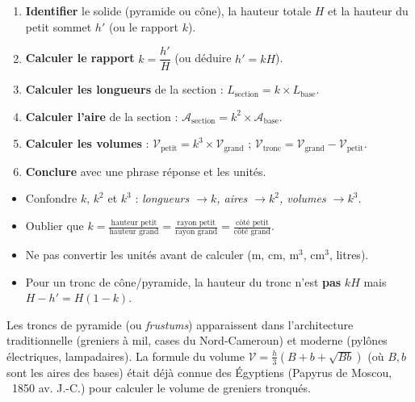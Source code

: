 \documentclass[11pt]{article}
\begin{document}
\begin{methode}
\begin{enumerate}
    \item \textbf{Identifier} le solide (pyramide ou cône), la hauteur totale $H$ et la hauteur du petit sommet $h'$ (ou le rapport $k$).
    \item \textbf{Calculer le rapport} $k = \dfrac{h'}{H}$ (ou déduire $h' = kH$).
    \item \textbf{Calculer les longueurs} de la section : $L_{\text{section}} = k \times L_{\text{base}}$.
    \item \textbf{Calculer l'aire} de la section : $\mathcal{A}_{\text{section}} = k^2 \times \mathcal{A}_{\text{base}}$.
    \item \textbf{Calculer les volumes} : $\mathcal{V}_{\text{petit}} = k^3 \times \mathcal{V}_{\text{grand}}$ ; $\mathcal{V}_{\text{tronc}} = \mathcal{V}_{\text{grand}} - \mathcal{V}_{\text{petit}}$.
    \item \textbf{Conclure} avec une phrase réponse et les unités.
\end{enumerate}
\end{methode}

\begin{attention}
\begin{itemize}
    \item Confondre $k$, $k^2$ et $k^3$ : \emph{longueurs $\to k$, aires $\to k^2$, volumes $\to k^3$}.
    \item Oublier que $k = \frac{\text{hauteur petit}}{\text{hauteur grand}} = \frac{\text{rayon petit}}{\text{rayon grand}} = \frac{\text{côté petit}}{\text{côté grand}}$.
    \item Ne pas convertir les unités avant de calculer (m, cm, $\text{m}^3$, $\text{cm}^3$, litres).
    \item Pour un tronc de cône/pyramide, la hauteur du tronc n'est \textbf{pas} $kH$ mais $H - h' = H(1-k)$.
\end{itemize}
\end{attention}

\begin{savaistu}
Les troncs de pyramide (ou \emph{frustums}) apparaissent dans l'architecture traditionnelle (greniers à mil, cases du Nord-Cameroun) et moderne (pylônes électriques, lampadaires). La formule du volume $\mathcal{V} = \frac{h}{3}(B + b + \sqrt{Bb})$ (où $B,b$ sont les aires des bases) était déjà connue des Égyptiens (Papyrus de Moscou, ~1850 av. J.-C.) pour calculer le volume de greniers tronqués.
\end{savaistu}
\end{document}
